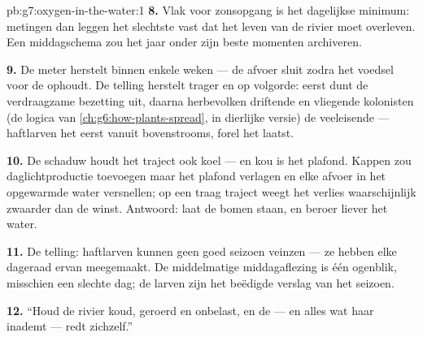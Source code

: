 \begin{solution}{pb:g7:oxygen-in-the-water:1}
\textbf{8.} Vlak voor zonsopgang is het dagelijkse minimum: metingen dan
leggen het slechtste vast dat het leven van de rivier moet overleven. Een
middagschema zou het jaar onder zijn beste momenten archiveren.

\textbf{9.} De meter herstelt binnen enkele weken --- de afvoer sluit
zodra het voedsel voor de  ophoudt. De telling herstelt trager
en op volgorde: eerst dunt de verdraagzame bezetting uit, daarna
herbevolken driftende en vliegende kolonisten (de logica van
\cref{ch:g6:how-plants-spread}, in dierlijke versie) de veeleisende
 --- haftlarven het eerst vanuit bovenstrooms, forel het laatst.

\textbf{10.} De schaduw houdt het traject ook koel --- en kou is het
plafond. Kappen zou daglichtproductie toevoegen maar het plafond verlagen
en elke afvoer in het opgewarmde water versnellen; op een traag traject
weegt het verlies waarschijnlijk zwaarder dan de winst. Antwoord: laat de
bomen staan, en beroer liever het water.

\textbf{11.} De telling: haftlarven kunnen geen goed seizoen veinzen ---
ze hebben elke dageraad ervan meegemaakt. De middelmatige middagaflezing
is één ogenblik, misschien een slechte dag; de larven zijn het beëdigde
verslag van het seizoen.

\textbf{12.} ``Houd de rivier koud, geroerd en onbelast, en de 
--- en alles wat haar inademt --- redt zichzelf.''
\end{solution}
